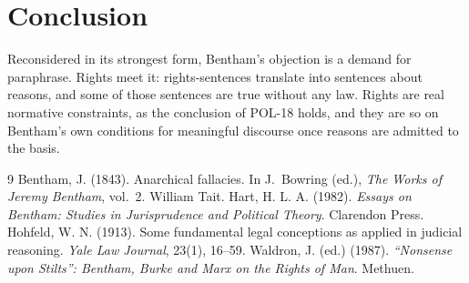 \documentclass{situationist-preprint}
\begin{document}
\section{Conclusion}

Reconsidered in its strongest form, Bentham's objection is a demand for paraphrase. Rights meet it: rights-sentences translate into sentences about reasons, and some of those sentences are true without any law. Rights are real normative constraints, as the conclusion of POL-18 holds, and they are so on Bentham's own conditions for meaningful discourse once reasons are admitted to the basis.

\begin{thebibliography}{9}\small
{} Bentham, J. (1843). Anarchical fallacies. In J.~Bowring (ed.), \emph{The Works of Jeremy Bentham}, vol.~2. William Tait.
 Hart, H. L. A. (1982). \emph{Essays on Bentham: Studies in Jurisprudence and Political Theory}. Clarendon Press.
 Hohfeld, W. N. (1913). Some fundamental legal conceptions as applied in judicial reasoning. \emph{Yale Law Journal}, 23(1), 16--59.
 Waldron, J. (ed.) (1987). \emph{\enquote{Nonsense upon Stilts}: Bentham, Burke and Marx on the Rights of Man}. Methuen.
\end{thebibliography}
\end{document}
